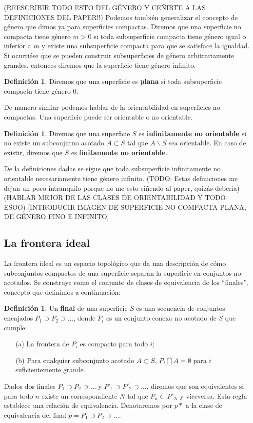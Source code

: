 \documentclass[a4paper,11pt,spanish, twoside, leqno]{tfg-uam}
\theoremstyle{definition}
\newtheorem{defin}[teor]{Definici\'on}
\begin{document}
(REESCRIBIR TODO ESTO DEL GÉNERO Y CEÑIRTE A LAS DEFINICIONES DEL PAPER!!)
Podemos también generalizar el concepto de género que dimos ya para superficies compactas. Diremos que una superficie no compacta tiene género $m > 0$ si toda subsuperficie compacta tiene género igual o inferior a $m$ y existe una subsuperficie compacta para que se satisface la igualdad. Si ocurriése que se pueden construir subsuperficies de género arbitrariamente grandes, entonces diremos que la superficie tiene género infinito. 
\begin{defin}
Diremos que una superficie es \textbf{plana} si toda subsuperficie compacta tiene género 0. 
\end{defin}

De manera similar podemos hablar de la orientabilidad en superficies no compactas. Una superficie puede ser orientable o no orientable. 
\begin{defin}
Diremos que una superficie $S$ es \textbf{infinitamente no orientable} si no existe un subconjutno acotado  $A \subset S$ tal que $A\backslash S$ sea orientable. En caso de existir, diremos que $S$ es \textbf{finitamente no orientable}.
\end{defin}
De la definiciones dadas se sigue que toda subsuperficie infinitamente no orientable necesariamente tiene género infinito.
(TODO: Estas definiciones me dejan un poco intranquilo porque no me esto ciñendo al paper, quizás debería)
(HABLAR MEJOR DE LAS CLASES DE ORIENTABILIDAD Y TODO ESOO)
[INTRODUCIR IMAGEN DE SUPERFICIE NO COMPACTA PLANA, DE GÉNERO FINO E INFINITO]
\\

\subsection{La frontera ideal}
La frontera ideal es un espacio topológico que da una descripción de cómo subconjuntos compactos de una superficie separan la superficie en conjuntos no acotados. Se construye como el conjunto de clases de equivalencia de los ``finales'', concepto que definimos a continuación:

\begin{defin}
Un \textbf{final} de una superficie $S$ es una secuencia de conjuntos encajados $P_1 \supset P_2 \supset \ldots$, donde $P_i$ es un conjunto conexo no acotado de $S$ que cumple:
\begin{enumerate}
\item[(a)] La frontera de $P_i$ es compacto para todo $i$;
\item[(b)] Para cualquier subconjunto acotado $A \subset S$, $P_i \bigcap A = \emptyset$ para $i$ suficientemente grande.
\end{enumerate}
\end{defin}
Dados dos finales $P_1 \supset P_2 \supset \ldots$ y $P'_1 \supset P'_2 \supset \ldots$, diremos que son equivalentes si para todo $n$ existe un correspondiente $N$ tal que $P_n \subset P'_N$ y viceversa.  Esta regla establece una relación de equivalencia. Denotaremos por $p*$ a la clase de equivalencia del final $p = P_1 \supset P_2 \supset \ldots$.
\end{document}
